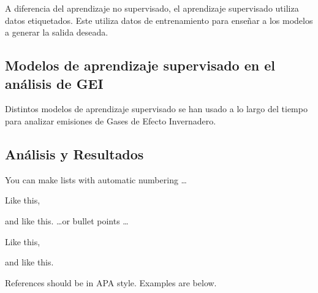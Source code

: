 \documentclass[12pt]{article}
\let\tempone\itemize
\let\temptwo\enditemize
\let\tempthree\enumerate
\let\tempfour\endenumerate
\renewenvironment{itemize}{\tempone\setlength{\itemsep}{0pt}}{\temptwo}
\renewenvironment{enumerate}{\tempthree\setlength{\itemsep}{0pt}}{\tempfour}
\begin{document}
A diferencia del aprendizaje no supervisado, el aprendizaje supervisado utiliza datos etiquetados. Este utiliza datos de entrenamiento para enseñar a los modelos a generar la salida deseada.

\subsection{Modelos de aprendizaje supervisado en el análisis de GEI}

Distintos modelos de aprendizaje supervisado se han usado a lo largo del tiempo para analizar emisiones de Gases de Efecto Invernadero.



\subsection{Análisis y Resultados}

You can make lists with automatic numbering \dots

\begin{enumerate}
\item Like this,
\item and like this.
\end{enumerate}
\dots or bullet points \dots
\begin{itemize}
\item Like this,
\item and like this.
\end{itemize}

References should be in APA style. Examples are below.

%
%


\end{document}
